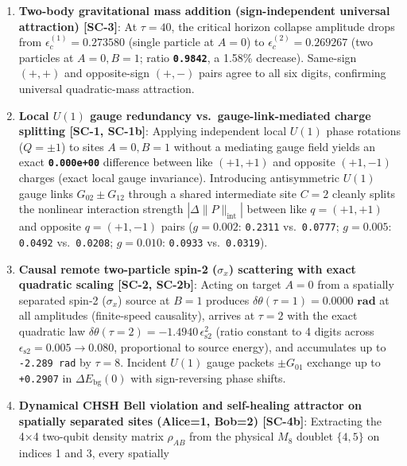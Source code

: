 \documentclass[
  a4paper,
]{article}
\providecommand{\tightlist}{%
  \setlength{\itemsep}{0pt}\setlength{\parskip}{0pt}}
\begin{document}
\begin{enumerate}
\def\labelenumi{\arabic{enumi}.}
\tightlist
\item
  \textbf{Two-body gravitational mass addition (sign-independent
  universal attraction) {[}SC-3{]}}: At \(\tau = 40\), the critical
  horizon collapse amplitude drops from
  \(\epsilon_c^{(1)} = \mathbf{0.273580}\) (single particle at \(A=0\))
  to \(\epsilon_c^{(2)} = \mathbf{0.269267}\) (two particles at
  \(A=0, B=1\); ratio \textbf{\texttt{0.9842}}, a 1.58\% decrease).
  Same-sign \((+,+)\) and opposite-sign \((+,-)\) pairs agree to all six
  digits, confirming universal quadratic-mass attraction.
\item
  \textbf{Local \(U(1)\) gauge redundancy vs.~gauge-link-mediated charge
  splitting {[}SC-1, SC-1b{]}}: Applying independent local \(U(1)\)
  phase rotations (\(Q = \pm 1\)) to sites \(A=0, B=1\) without a
  mediating gauge field yields an exact \textbf{\texttt{0.000e+00}}
  difference between like \((+1,+1)\) and opposite \((+1,-1)\) charges
  (exact local gauge invariance). Introducing antisymmetric \(U(1)\)
  gauge links \(G_{02} \pm G_{12}\) through a shared intermediate site
  \(C=2\) cleanly splits the nonlinear interaction strength
  \(|\Delta\|P\|_{\mathrm{int}}|\) between like \(q=(+1,+1)\) and
  opposite \(q=(+1,-1)\) pairs (\(g=0.002\): \texttt{0.2311}
  vs.~\texttt{0.0777}; \(g=0.005\): \texttt{0.0492} vs.~\texttt{0.0208};
  \(g=0.010\): \texttt{0.0933} vs.~\texttt{0.0319}).
\item
  \textbf{Causal remote two-particle spin-2 (\(\sigma_x\)) scattering
  with exact quadratic scaling {[}SC-2, SC-2b{]}}: Acting on target
  \(A=0\) from a spatially separated spin-2 (\(\sigma_x\)) source at
  \(B=1\) produces
  \textbf{\(\delta\theta(\tau=1) = \mathbf{0.0000\text{ rad}}\)} at all
  amplitudes (finite-speed causality), arrives at \(\tau=2\) with the
  exact quadratic law
  \textbf{\(\delta\theta(\tau=2) = -1.4940\,\epsilon_{\mathrm{s2}}^2\)}
  (ratio constant to 4 digits across
  \(\epsilon_{\mathrm{s2}} = 0.005 \to 0.080\), proportional to source
  energy), and accumulates up to \texttt{-2.289\ rad} by \(\tau=8\).
  Incident \(U(1)\) gauge packets \(\pm G_{01}\) exchange up to
  \texttt{+0.2907} in \(\Delta E_{\mathrm{bg}}(0)\) with sign-reversing
  phase shifts.
\item
  \textbf{Dynamical CHSH Bell violation and self-healing attractor on
  spatially separated sites (Alice=1, Bob=2) {[}SC-4b{]}}: Extracting
  the 4×4 two-qubit density matrix \(\rho_{AB}\) from the physical
  \(M_8\) doublet \(\{4,5\}\) on indices 1 and 3, every spatially

\end{enumerate}
\end{document}
